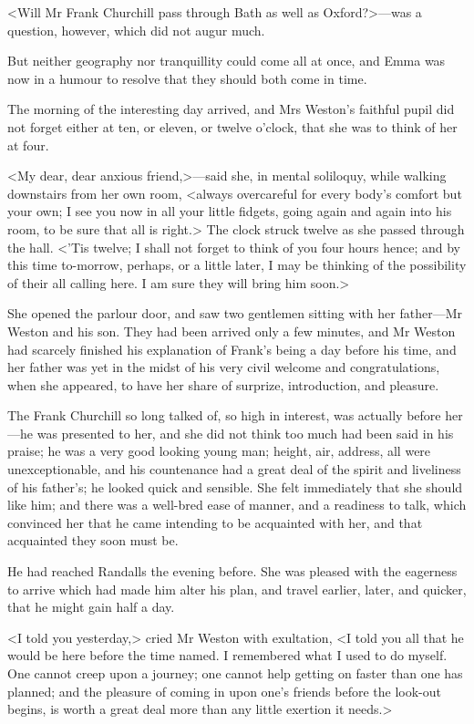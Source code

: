 <Will Mr Frank Churchill pass through Bath as well as Oxford?>—was a question, however, which did not augur much.

But neither geography nor tranquillity could come all at once, and Emma was now in a humour to resolve that they should both come in time.

The morning of the interesting day arrived, and Mrs Weston's faithful pupil did not forget either at ten, or eleven, or twelve o'clock, that she was to think of her at four.

<My dear, dear anxious friend,>—said she, in mental soliloquy, while walking downstairs from her own room, <always overcareful for every body's comfort but your own; I see you now in all your little fidgets, going again and again into his room, to be sure that all is right.> The clock struck twelve as she passed through the hall. <'Tis twelve; I shall not forget to think of you four hours hence; and by this time to-morrow, perhaps, or a little later, I may be thinking of the possibility of their all calling here. I am sure they will bring him soon.>

She opened the parlour door, and saw two gentlemen sitting with her father—Mr Weston and his son. They had been arrived only a few minutes, and Mr Weston had scarcely finished his explanation of Frank's being a day before his time, and her father was yet in the midst of his very civil welcome and congratulations, when she appeared, to have her share of surprize, introduction, and pleasure.

The Frank Churchill so long talked of, so high in interest, was actually before her—he was presented to her, and she did not think too much had been said in his praise; he was a very good looking young man; height, air, address, all were unexceptionable, and his countenance had a great deal of the spirit and liveliness of his father's; he looked quick and sensible. She felt immediately that she should like him; and there was a well-bred ease of manner, and a readiness to talk, which convinced her that he came intending to be acquainted with her, and that acquainted they soon must be.

He had reached Randalls the evening before. She was pleased with the eagerness to arrive which had made him alter his plan, and travel earlier, later, and quicker, that he might gain half a day.

<I told you yesterday,> cried Mr Weston with exultation, <I told you all that he would be here before the time named. I remembered what I used to do myself. One cannot creep upon a journey; one cannot help getting on faster than one has planned; and the pleasure of coming in upon one's friends before the look-out begins, is worth a great deal more than any little exertion it needs.>

